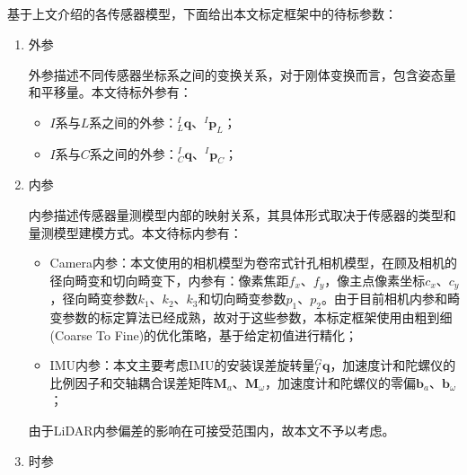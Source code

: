 \label{sensro_model_imu}

\subsection{}
\label{suubsubsec:calib_param}
基于上文介绍的各传感器模型，下面给出本文标定框架中的待标参数：
\begin{enumerate}
  \item 外参

        外参描述不同传感器坐标系之间的变换关系，对于刚体变换而言，包含姿态量和平移量。本文待标外参有：
        \begin{itemize}
          \item $I$系与$L$系之间的外参：${^{I}_{L}}\boldsymbol{q}$、${^{I}}\boldsymbol{p}_{L}$；
          \item $I$系与$C$系之间的外参：${^{I}_{C}}\boldsymbol{q}$、${^{I}}\boldsymbol{p}_{C}$；
        \end{itemize}

  \item 内参

        内参描述传感器量测模型内部的映射关系，其具体形式取决于传感器的类型和量测模型建模方式。本文待标内参有：
        \begin{itemize}
          \item Camera内参：本文使用的相机模型为卷帘式针孔相机模型，在顾及相机的径向畸变和切向畸变下，内参有：像素焦距$f_x$、$f_y$，像主点像素坐标$c_x$、$c_y$，径向畸变参数$k_1$、$k_2$、$k_3$和切向畸变参数$p_1$、$p_2$。由于目前相机内参和畸变参数的标定算法已经成熟，故对于这些参数，本标定框架使用由粗到细(Coarse To Fine)的优化策略，基于给定初值进行精化；
          \item IMU内参：本文主要考虑IMU的安装误差旋转量${^{G}_{I}\boldsymbol{q}}$，加速度计和陀螺仪的比例因子和交轴耦合误差矩阵$\boldsymbol{M}_{a}$、$\boldsymbol{M}_{\omega}$，加速度计和陀螺仪的零偏$\boldsymbol{b}_a$、$\boldsymbol{b}_\omega$；
        \end{itemize}
        由于LiDAR内参偏差的影响在可接受范围内，故本文不予以考虑。
  \item 时参


\end{enumerate}
